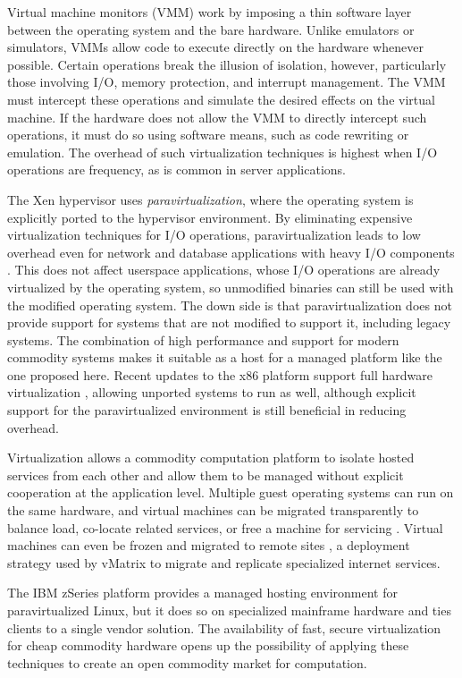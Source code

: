 Virtual machine monitors (VMM) work by imposing a thin software layer between the operating system and the bare hardware. Unlike emulators or simulators, VMMs allow code to execute directly on the hardware whenever possible. Certain operations break the illusion of isolation, however, particularly those involving I/O, memory protection, and interrupt management. The VMM must intercept these operations and simulate the desired effects on the virtual machine. If the hardware does not allow the VMM to directly intercept such operations, it must do so using software means, such as code rewriting or emulation. The overhead of such virtualization techniques is highest when I/O operations are frequency, as is common in server applications.

The Xen hypervisor uses \emph{paravirtualization}, where the operating system is explicitly ported to the hypervisor environment. By eliminating expensive virtualization techniques for I/O operations, paravirtualization leads to low overhead even for network and database applications with heavy I/O components \cite{barham}. This does not affect userspace applications, whose I/O operations are already virtualized by the operating system, so unmodified binaries can still be used with the modified operating system. The down side is that paravirtualization does not provide support for systems that are not modified to support it, including legacy systems. The combination of high performance and support for modern commodity systems makes it suitable as a host for a managed platform like the one proposed here. Recent updates to the x86 platform support full hardware virtualization \cite{adams}, allowing unported systems to run as well, although explicit support for the paravirtualized environment is still beneficial in reducing overhead.

Virtualization allows a commodity computation platform to isolate hosted services from each other and allow them to be managed without explicit cooperation at the application level. Multiple guest operating systems can run on the same hardware, and virtual machines can be migrated transparently to balance load, co-locate related services, or free a machine for servicing \cite{clark}. Virtual machines can even be frozen and migrated to remote sites \cite{sapuntzakis02}, a deployment strategy used by vMatrix \cite{awadallah} to migrate and replicate specialized internet services.

The IBM zSeries \cite{ibmzseries} platform provides a managed hosting environment for paravirtualized Linux, but it does so on specialized mainframe hardware and ties clients to a single vendor solution. The availability of fast, secure virtualization for cheap commodity hardware opens up the possibility of applying these techniques to create an open commodity market for computation.

